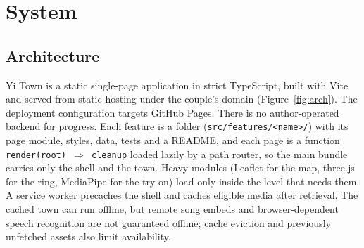 \documentclass[sigconf,nonacm]{acmart}
\newcommand{\yt}{Yi Town}
\newcommand{\code}[1]{\textnormal{\texttt{\small #1}}}
\begin{document}
\section{System}\label{sec:system}

\subsection{Architecture}
\yt{} is a static single-page application in strict TypeScript, built with Vite and served from
static hosting under the couple's domain (Figure~\ref{fig:arch}). The deployment configuration
targets GitHub Pages. There is no author-operated backend for progress. Each feature
is a folder (\code{src/features/<name>/}) with its page module, styles, data, tests and a README,
and each page is a function \code{render(root) $\Rightarrow$ cleanup} loaded lazily by a path
router, so the main bundle carries only the shell and the town. Heavy modules (Leaflet for the map,
three.js for the ring, MediaPipe for the try-on) load only inside the level that needs them. A
service worker precaches the shell and caches eligible media after retrieval. The cached
town can run offline, but remote song embeds and browser-dependent speech recognition are not
guaranteed offline; cache eviction and previously unfetched assets also limit availability.
\end{document}
